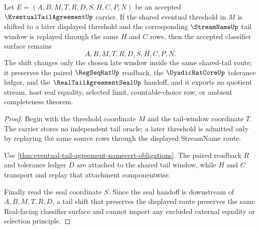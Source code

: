 \begin{theorem}
\label{thm:eventual-tail-agreement-tail-shift-invariance}
Let $E=(A,B,M,T,R,D,S,H,C,P,N)$ be an accepted $\EventualTailAgreementUp$ carrier. If the shared eventual threshold in $M$ is shifted to a later displayed threshold and the corresponding $\StreamNameUp$ tail window is replayed through the same $H$ and $C$ rows, then the accepted classifier surface remains
$$
A,B,M,T,R,D,S,H,C,P,N.
$$
The shift changes only the chosen late window inside the same shared-tail route; it preserves the paired $\RegSeqRatUp$ readback, the $\DyadicRatCoreUp$ tolerance ledger, and the $\RealTailAgreementSealUp$ handoff, and it exports no quotient stream, host real equality, selected limit, countable-choice row, or ambient completeness theorem.
\end{theorem}
\begin{proof}
Begin with the threshold coordinate $M$ and the tail-window coordinate $T$. The carrier stores no independent tail oracle; a later threshold is admitted only by replaying the same source rows through the displayed StreamName route.

Use \autoref{thm:eventual-tail-agreement-namecert-obligations}. The paired readback $R$ and tolerance ledger $D$ are attached to the shared tail window, while $H$ and $C$ transport and replay that attachment componentwise.

Finally read the seal coordinate $S$. Since the seal handoff is downstream of $A,B,M,T,R,D$, a tail shift that preserves the displayed route preserves the same Real-facing classifier surface and cannot import any excluded external equality or selection principle.
\end{proof}

